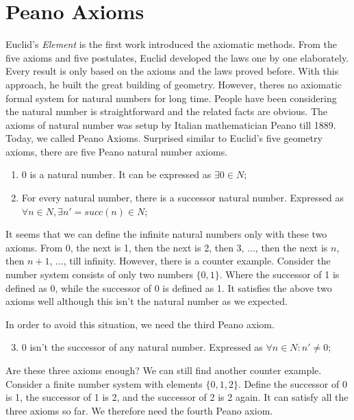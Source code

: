 \documentclass[UTF8]{article}
\begin{document}
\section{Peano Axioms}

Euclid's {\em Element} is the first work introduced the axiomatic methods. From the five axioms and five postulates, Euclid developed the laws one by one elaborately. Every result is only based on the axioms and the laws proved before. With this approach, he built the great building of geometry. However, theres no axiomatic formal system for natural numbers for long time. People have been considering the natural number is straightforward and the related facts are obvious. The axioms of natural number was setup by Italian mathematician Peano till 1889. Today, we called Peano Axioms. Surprised similar to Euclid's five geometry axioms, there are five Peano natural number axioms.

\begin{enumerate}
\item 0 is a natural number. It can be expressed as $\exists 0 \in N$;
\item For every natural number, there is a successor natural number. Expressed as $\forall n \in N, \exists n' = succ(n) \in N$;
\end{enumerate}

It seems that we can define the infinite natural numbers only with these two axioms. From 0, the next is 1, then the next is 2, then 3, ..., then the next is $n$, then $n+1$, ..., till infinity. However, there is a counter example. Consider the number system consists of only two numbers $\{0, 1\}$. Where the successor of 1 is defined as 0, while the successor of 0 is defined as 1. It satisfies the above two axioms well although this isn't the natural number as we expected.

In order to avoid this situation, we need the third Peano axiom.

\begin{enumerate}
  \setcounter{enumi}{2}
  \item 0 isn't the successor of any natural number. Expressed as $\forall n \in N: n' \neq 0$;
\end{enumerate}

Are these three axioms enough? We can still find another counter example. Consider a finite number system with elements $\{0, 1, 2\}$. Define the successor of 0 is 1, the successor of 1 is 2, and the successor of 2 is 2 again. It can satisfy all the three axioms so far. We therefore need the fourth Peano axiom.
\end{document}
